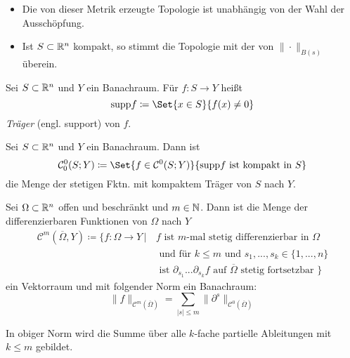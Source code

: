 \documentclass{cheat-sheet}
\newcommand{\supp}{\mathrm{supp}}
\begin{document}
\begin{bem}
  \begin{itemize}
    \item Die von dieser Metrik erzeugte Topologie ist unabhängig von der Wahl der Ausschöpfung.
    \item Ist $S \subset \mathbb{R}^n$ kompakt, so stimmt die Topologie mit der von $\| \cdot \|_{B(s)}$ überein.
  \end{itemize}
\end{bem}

\begin{defn}
  Sei $S \subset \mathbb{R}^n$ und $Y$ ein Banachraum. Für $f : S \to Y$ heißt
  \[ \supp f \coloneqq \Set{ x \in S }{ f(x) \not= 0 } \]
  \emph{Träger} (engl. support) von $f$.
\end{defn}

\begin{defn}
  Sei $S \subset \mathbb{R}^n$ und $Y$ ein Banachraum. Dann ist
  \[ \mathcal{C}_0^0(S; Y) \coloneqq \Set{ f \in \mathcal{C}^0(S; Y) }{ \supp f \text{ ist kompakt in } S } \]
  die Menge der stetigen Fktn. mit kompaktem Träger von $S$ nach $Y$.
\end{defn}

\begin{defn}
  Sei $\Omega \subset \mathbb{R}^n$ offen und beschränkt und $m \in \mathbb{N}$. Dann ist die Menge der differenzierbaren Funktionen von $\Omega$ nach $Y$
  \begin{align*}
    \mathcal{C}^m(\overline\Omega, Y) \coloneqq \{ f : \Omega \to Y \,|\, & f \text{ ist $m$-mal stetig differenzierbar in $\Omega$ } \\
    & \text{ und für $k \leq m$ und } s_1, ..., s_k \in \{ 1, ..., n \} \\
    & \text{ ist $\partial_{s_1} ... \partial_{s_k} f$ auf $\overline\Omega$ stetig fortsetzbar } \}
  \end{align*}
  ein Vektorraum und mit folgender Norm ein Banachraum:
  \[ \| f \|_{\mathcal{C}^m(\overline\Omega)} = \sum_{|s| \leq m} \| \partial^s \|_{\mathcal{C}^0(\overline\Omega)} \]
\end{defn}

\begin{bem}
  In obiger Norm wird die Summe über alle $k$-fache partielle Ableitungen mit $k \leq m$ gebildet.
\end{bem}

\end{document}
